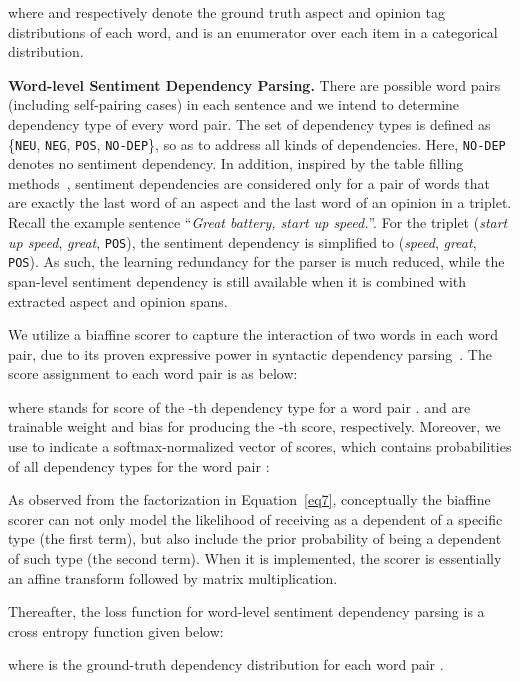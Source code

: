 \documentclass[11pt,a4paper]{article}
\begin{document}
where  and  respectively denote the ground truth aspect and opinion tag distributions of each word, and  is an enumerator over each item in a categorical distribution.

\noindent \textbf{Word-level Sentiment Dependency Parsing.} There are  possible word pairs (including self-pairing cases) in each sentence and we intend to determine dependency type of every word pair. The set of dependency types is defined as \{\texttt{NEU}, \texttt{NEG}, \texttt{POS}, \texttt{NO-DEP}\}, so as to address all kinds of dependencies. Here, \texttt{NO-DEP} denotes no sentiment dependency. In addition, inspired by the table filling methods~\cite{miwa2014modeling,bekoulis2018joint}, sentiment dependencies are considered only for a pair of words that are exactly the last word of an aspect and the last word of an opinion in a triplet. Recall the example sentence ``\textit{Great battery, start up speed.}''. For the triplet (\textit{start up speed}, \textit{great}, \texttt{POS}), the sentiment dependency is simplified to (\textit{speed}, \textit{great}, \texttt{POS}). As such, the learning redundancy for the parser is much reduced, while the span-level sentiment dependency is still available when it is combined with extracted aspect and opinion spans.

We utilize a biaffine scorer to capture the interaction of two words in each word pair, due to its proven expressive power in syntactic dependency parsing~\cite{dozat2017deep}. The score assignment to each word pair is as below:

where  stands for score of the -th dependency type for a word pair .  and  are trainable weight and bias for producing the -th score, respectively. Moreover, we use  to indicate a softmax-normalized vector of scores, which contains probabilities of all dependency types for the word pair :


As observed from the factorization in Equation~\ref{eq7}, conceptually the biaffine scorer can not only model the likelihood of  receiving  as a dependent of a specific type (the first term), but also include the prior probability of  being a dependent of such type (the second term). When it is implemented, the scorer is essentially an affine transform followed by matrix multiplication.

Thereafter, the loss function for word-level sentiment dependency parsing is a cross entropy function given below:

where  is the ground-truth dependency distribution for each word pair .
\end{document}
